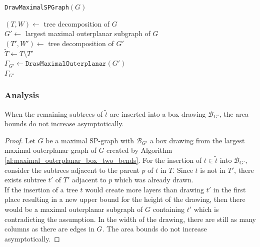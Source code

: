 \begin{algorithm}[H]
	\caption{\texttt{DrawMaximalSPGraph}$(G)$}\label{al:DrawMaximalSPGraph}
	$(T,W) \gets$ tree decomposition of $G$\\
	$G' \gets$ largest maximal outerplanar subgraph of $G$\\
	$(T',W') \gets$ tree decomposition of $G'$\\
	$\tilde{T} \gets T\setminus T'$\\
	$\Gamma_{G'} \gets \texttt{DrawMaximalOuterplanar}(G')$\\
	\Return $\Gamma_{G'}$
\end{algorithm}

\subsubsection{Analysis}

\begin{lemma}
	When the remaining subtrees of $\tilde{t}$ are inserted into a box drawing $\mathcal{B}_{G'}$, the area bounds do not increase asymptotically.\label{l:SP_not_increasing_area}
\end{lemma}
\begin{proof}
	Let $G$ be a maximal SP-graph with $\mathcal{B}_{G'}$ a box drawing from the largest maximal outerplanar graph of $G$ created by Algorithm \ref{al:maximal_outerplanar_box_two_bends}. For the insertion of $t\in \tilde{t}$ into $\mathcal{B}_{G'}$, consider the subtrees adjacent to the parent $p$ of $t$ in $T$. Since $t$ is not in $T'$, there exists subtree $t'$ of $T'$ adjacent to $p$ which was already drawn.\\
	If the insertion of a tree $t$ would create more layers than drawing $t'$ in the first place resulting in a new upper bound for the height of the drawing, then there would be a maximal outerplanar subgraph of $G$ containing $t'$ which is contradicting the assumption. In the width of the drawing, there are still as many columns as there are edges in $G$. The area bounds do not increase asymptotically.
\end{proof}

